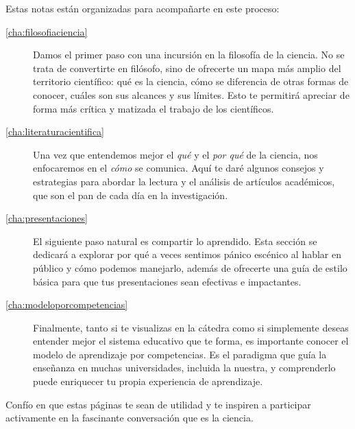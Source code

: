 Estas notas están organizadas para acompañarte en este proceso:

\begin{description}
      \item[\autoref{cha:filosofiaciencia}] Damos el primer paso
            con una incursión en la filosofía de la ciencia.
            No se trata de convertirte en filósofo,
            sino de ofrecerte un mapa más amplio del territorio científico:
            qué es la ciencia, cómo se diferencia de otras formas de conocer,
            cuáles son sus alcances y sus límites.
            Esto te permitirá apreciar de forma más crítica y matizada
            el trabajo de los científicos.
      \item[\autoref{cha:literaturacientifica}] Una vez que entendemos mejor
            el \emph{qué} y el \emph{por qué} de la ciencia, nos enfocaremos en
            el \emph{cómo} se comunica.
            Aquí te daré algunos consejos y estrategias para abordar la lectura
            y el análisis de artículos académicos, que son el pan de cada día en
            la investigación.
      \item[\autoref{cha:presentaciones}] El siguiente paso natural es compartir
            lo aprendido.
            Esta sección se dedicará a explorar por qué a veces sentimos pánico
            escénico al hablar en público y cómo podemos manejarlo, además de
            ofrecerte una guía de estilo básica para que tus presentaciones sean
            efectivas e impactantes.
      \item[\autoref{cha:modeloporcompetencias}] Finalmente, tanto si te
            visualizas en la cátedra como si simplemente deseas entender mejor
            el sistema educativo que te forma, es importante conocer el modelo
            de aprendizaje por competencias.
            Es el paradigma que guía la enseñanza en muchas universidades,
            incluida la nuestra, y comprenderlo puede enriquecer tu propia
            experiencia de aprendizaje.
\end{description}

Confío en que estas páginas te sean de utilidad y te inspiren a participar
activamente en la fascinante conversación que es la ciencia.
